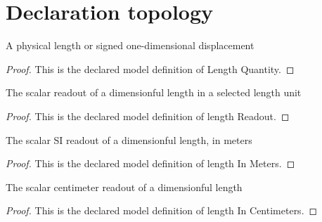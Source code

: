 \section{Declaration topology}
\begin{definition}
  \label{def:physics:phyx-mini-0062:phyxminiproblems-problemphyxmini0062-lengthquantity}
  A physical length or signed one-dimensional displacement
\end{definition}
\begin{proof}
  This is the declared model definition of Length Quantity.
\end{proof}
\begin{definition}
  \label{def:physics:phyx-mini-0062:phyxminiproblems-problemphyxmini0062-lengthreadout}
  The scalar readout of a dimensionful length in a selected length unit
\end{definition}
\begin{proof}
  This is the declared model definition of length Readout.
\end{proof}
\begin{definition}
  \label{def:physics:phyx-mini-0062:phyxminiproblems-problemphyxmini0062-lengthinmeters}
  The scalar SI readout of a dimensionful length, in meters
\end{definition}
\begin{proof}
  This is the declared model definition of length In Meters.
\end{proof}
\begin{definition}
  \label{def:physics:phyx-mini-0062:phyxminiproblems-problemphyxmini0062-lengthincentimeters}
  The scalar centimeter readout of a dimensionful length
\end{definition}
\begin{proof}
  This is the declared model definition of length In Centimeters.
\end{proof}
